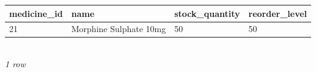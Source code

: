 {\scriptsize\setlength{\tabcolsep}{2.5pt}\begin{tabular}{llll}\toprule
\textbf{medicine\_id} & \textbf{name} & \textbf{stock\_quantity} & \textbf{reorder\_level} \\\midrule
21 & Morphine Sulphate 10mg & 50 & 50 \\
\bottomrule\end{tabular}}\\[-1pt]{\tiny\itshape 1 row}

